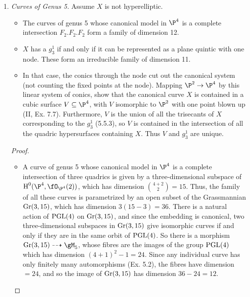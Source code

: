 \documentclass[a4paper]{article}
\begin{document}
\begin{enumerate} [label=\textbf{\arabic*.}, leftmargin=0em]
  \item[\textbf{5.}] \textit{Curves of Genus 5.} Assume $X$ is not hyperelliptic.
        \begin{itemize}
          \item[(a)] The curves of genus 5 whose canonical model in $\P^4$ is a complete intersection $F_2.F_2.F_2$ form a family of dimension 12.
          \item[(b)] $X$ has a $g_3^1$ if and only if it can be represented as a plane quintic with one node.
                These form an irreducible family of dimension 11.
          \item[(c)] In that case, the conics through the node cut out the canonical system (not counting the fixed points at the node).
                Mapping $\P^2 \to \P^4$ by this linear system of conics, show that the canonical curve $X$ is contained in a cubic surface $V \subseteq \P^4$, with $V$ isomorphic to $\P^2$ with one point blown up (II, Ex. 7.7).
                Furthermore, $V$ is the union of all the trisecants of $X$ corresponding to the $g_3^1$ (5.5.3), so $V$ is contained in the intersection of all the quadric hypersurfaces containing $X$.
                Thus $V$ and $g_3^1$ are unique.
        \end{itemize}

        \begin{proof} $ $ \vspace{0pt}
          \begin{itemize} [leftmargin=0cm]
            \item[(a)] A curve of genus 5 whose canonical model in $\P^4$ is a complete intersection of three quadrics is given by a three-dimensional subspace of $\cH^0(\P^4, \fO_{\P^4}(2))$, which has dimension $\binom{4 + 2}{2} = 15$.
                  Thus, the family of all these curves is parametrized by an open subset of the Grassmannian $\operatorname{Gr}(3, 15)$, which has dimension $3(15 - 3) = 36$.
                  There is a natural action of $\operatorname{PGL}(4)$ on $\operatorname{Gr}(3, 15)$, and since the embedding is canonical, two three-dimensional subspaces in $\operatorname{Gr}(3, 15)$ give isomorphic curves if and only if they are in the same orbit of $\operatorname{PGL}(4)$.
                  So there is a morphism $\Gr(3, 15) \dashrightarrow \gM_5$, whose fibres are the images of the group $\operatorname{PGL}(4)$ which has dimension $(4 + 1)^2 - 1 = 24$.
                  Since any individual curve has only finitely many automorphisms (Ex. 5.2), the fibres have dimension $= 24$, and so the image of $\operatorname{Gr}(3, 15)$ has dimension $36 - 24 = 12$.


\end{itemize}
\end{proof}
\end{enumerate}
\end{document}
